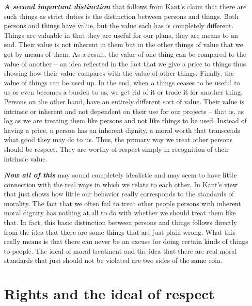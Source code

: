 \documentclass[
  12pt, openany]{book}
\begin{document}
\textbf{\emph{A second important distinction}} that follows from Kant's claim that there are such things as strict duties is the distinction between persons and things. Both persons and things have value, but the value each has is completely different. Things are valuable in that they are useful for our plans, they are means to an end. Their value is not inherent in them but in the other things of value that we get by means of them. As a result, the value of one thing can be compared to the value of another -- an idea reflected in the fact that we give a price to things thus showing how their value compares with the value of other things. Finally, the value of things can be used up. In the end, when a things ceases to be useful to us or even becomes a burden to us, we get rid of it or trade it for another thing. Persons on the other hand, have an entirely different sort of value. Their value is intrinsic or inherent and not dependent on their use for our projects -- that is, as log as we are treating them like persons and not like things to be used. Instead of having a price, a person has an inherent dignity, a moral worth that transcends what good they may do to us. Thus, the primary way we treat other persons should be respect. They are worthy of respect simply in recognition of their intrinsic value.

\textbf{\emph{Now all of this}} may sound completely idealistic and may seem to have little connection with the real ways in which we relate to each other. In Kant's view that just shows how little our behavior really corresponds to the standards of morality. The fact that we often fail to treat other people persons with inherent moral dignity has nothing at all to do with whether we should treat them like that. In fact, this basic distinction between persons and things follows directly from the idea that there are some things that are just plain wrong. What this really means is that there can never be an excuse for doing certain kinds of things to people. The ideal of moral treatment and the idea that there are real moral standards that just should not be violated are two sides of the same coin.

\hypertarget{rights-and-the-ideal-of-respect}{%
\section{Rights and the ideal of respect}\label{rights-and-the-ideal-of-respect}}
\end{document}
